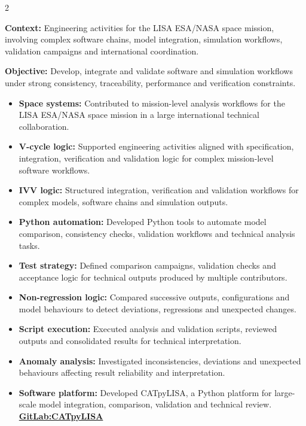 \documentclass[8pt,a4paper,ragged2e,withhyper]{../_shared/altacv}
\begin{document}
\begin{paracol}{2}
\divider


\textbf{Context:} Engineering activities for the LISA ESA/NASA space mission, involving complex software chains, model integration, simulation workflows, validation campaigns and international coordination.

\textbf{Objective:} Develop, integrate and validate software and simulation workflows under strong consistency, traceability, performance and verification constraints.

\begin{itemize}
  \item \textbf{Space systems:} Contributed to mission-level analysis workflows for the LISA ESA/NASA space mission in a large international technical collaboration.
  \item \textbf{V-cycle logic:} Supported engineering activities aligned with specification, integration, verification and validation logic for complex mission-level software workflows.
  \item \textbf{IVV logic:} Structured integration, verification and validation workflows for complex models, software chains and simulation outputs.
  \item \textbf{Python automation:} Developed Python tools to automate model comparison, consistency checks, validation workflows and technical analysis tasks.
  \item \textbf{Test strategy:} Defined comparison campaigns, validation checks and acceptance logic for technical outputs produced by multiple contributors.
  \item \textbf{Non-regression logic:} Compared successive outputs, configurations and model behaviours to detect deviations, regressions and unexpected changes.
  \item \textbf{Script execution:} Executed analysis and validation scripts, reviewed outputs and consolidated results for technical interpretation.
  \item \textbf{Anomaly analysis:} Investigated inconsistencies, deviations and unexpected behaviours affecting result reliability and interpretation.
  \item \textbf{Software platform:} Developed CATpyLISA, a Python platform for large-scale model integration, comparison, validation and technical review.
  \textcolor{DarkPastelRed}{\href{https://gitlab.oca.eu/gboileau/lisa_l3_tools}{\bf GitLab:CATpyLISA}}

\end{itemize}
\end{paracol}
\end{document}
